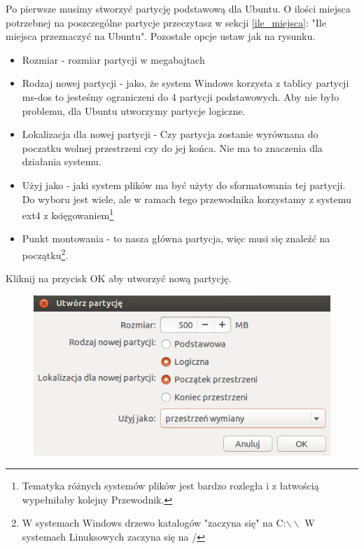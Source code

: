Po pierwsze musimy stworzyć partycję podstawową dla Ubuntu. O ilości miejsca potrzebnej na poszczególne partycje przeczytasz w sekcji \ref{ile_miejsca}: "Ile miejsca przeznaczyć na Ubuntu". Pozostałe opcje ustaw jak na rysunku.
\begin{itemize}
\item \textcolor{ubuntu_orange}{Rozmiar} - rozmiar partycji w megabajtach
\item \textcolor{ubuntu_orange}{Rodzaj nowej partycji} - jako, że system Windows korzysta z tablicy partycji ms-dos to jesteśmy ograniczeni do 4 partycji podstawowych. Aby nie było problemu, dla Ubuntu utworzymy partycje logiczne.
\item \textcolor{ubuntu_orange}{Lokalizacja dla nowej partycji} - Czy partycja zostanie wyrównana do poczatku wolnej przestrzeni czy do jej końca. Nie ma to znaczenia dla działania systemu.
\item \textcolor{ubuntu_orange}{Użyj jako} - jaki system plików ma być użyty do sformatowania tej partycji. Do wyboru jest wiele, ale w ramach tego przewodnika korzystamy z systemu ext4 z księgowaniem\footnote{Tematyka różnych systemów plików jest bardzo rozległa i z łatwością wypełniłaby kolejny Przewodnik.}
\item \textcolor{ubuntu_orange}{Punkt montowania} - to nasza główna partycja, więc musi się znaleźć na początku\footnote{W systemach Windows drzewo katalogów "zaczyna się" na C:$\backslash\backslash$ W systemach Linuksowych zaczyna się na /}.
\end{itemize}
Kliknij na przycisk \textcolor{ubuntu_orange}{OK} aby utworzyć nową partycję.
\clearpage
\begin{figure}
                \includegraphics[width=\linewidth]{images/instalator_partycjonowanie_gparted_dodaj_swap.png}
\end{figure}
